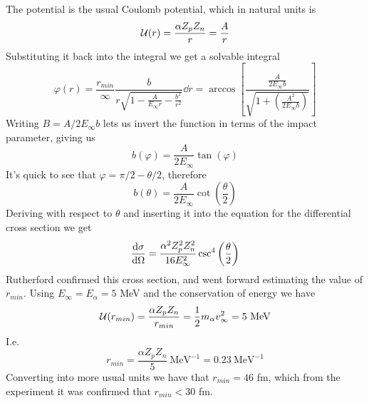 \documentclass[../qm.tex]{subfiles}
\begin{document}
The potential is the usual Coulomb potential, which in natural units is
\begin{equation*}
	\mathcal{U}(r)=\frac{\alpha Z_pZ_n}{r}=\frac{A}{r}
\end{equation*}
Substituting it back into the integral we get a solvable integral
\begin{equation}
	\varphi(r)=\frac{r_{min}}{\infty}\frac{b}{r\sqrt{1-\frac{A}{E_\infty r}-\frac{b^2}{r^2}}}\dd r=\arccos\left[ \frac{\frac{A}{2E_\infty b}}{\sqrt{1+\left( \frac{A^2}{2E_\infty b} \right)}} \right]
	\label{eq:phirruth}
\end{equation}
Writing $B=A/2E_\infty b$ lets us invert the function in terms of the impact parameter, giving us
\begin{equation}
	b(\varphi)=\frac{A}{2E_\infty}\tan\left( \varphi \right)
	\label{eq:impactruth}
\end{equation}
It's quick to see that $\varphi=\pi/2-\theta/2$, therefore
\begin{equation}
	b(\theta)=\frac{A}{2E_\infty}\cot\left( \frac{\theta}{2} \right)
	\label{eq:bthetaruth}
\end{equation}
Deriving with respect to $\theta$ and inserting it into the equation for the differential cross section we get
\begin{equation}
	\dv{\sigma}{\Omega}=\frac{\alpha^2 Z_p^2Z_n^2}{16E_\infty^2}\csc^4\left( \frac{\theta}{2} \right)
	\label{eq:ruthcrosssec}
\end{equation}
Rutherford confirmed this cross section, and went forward estimating the value of $r_{min}$. Using $E_\infty=E_\alpha=5$ MeV and the conservation of energy we have
\begin{equation*}
	\mathcal{U}(r_{min})=\frac{\alpha Z_pZ_n}{r_{min}}=\frac{1}{2}m_\alpha v_\infty^2=5\ \mathrm{MeV}
\end{equation*}
I.e.
\begin{equation*}
	r_{min}=\frac{\alpha Z_pZ_n}{5}\ \mathrm{MeV^{-1}}=0.23\ \mathrm{MeV^{-1}}
\end{equation*}
Converting into more usual units we have that $r_{min}=46$ fm, which from the experiment it was confirmed that $r_{min}<30$ fm.\\
\end{document}
